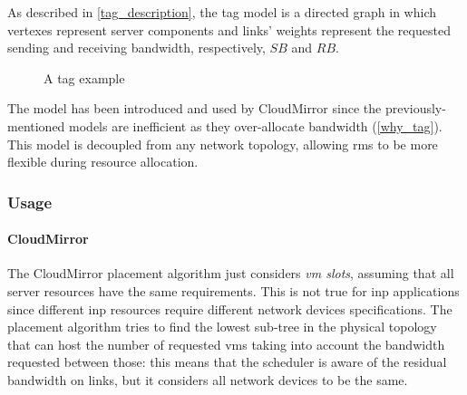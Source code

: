 
As described in \autoref{tag_description}, the \gls{tag} model is a directed graph in which vertexes represent server components and links' weights represent the requested sending and receiving bandwidth, respectively, $SB$ and $RB$.

\begin{figure}[!htb]
    \centering
    \usebox{\tagfigure}
    \caption{A \gls{tag} example}
\end{figure}

The model has been introduced and used by CloudMirror \cite{cloudmirror} since the previously\hyp{}mentioned models are inefficient as they over\hyp{}allocate bandwidth (\autoref{why_tag}).
This model is decoupled from any network topology, allowing \glspl{rm} to be more flexible during resource allocation.

\subsubsection{Usage}
\paragraph{CloudMirror \texorpdfstring{\cite{cloudmirror}}{}}
The CloudMirror \cite{cloudmirror} placement algorithm just considers \textit{\gls{vm} slots}, assuming that all server resources have the same requirements.
This is not true for \gls{inp} applications since different \gls{inp} resources require different network devices specifications.
The placement algorithm tries to find the lowest sub-tree in the physical topology that can host the number of requested \glspl{vm} taking into account the bandwidth requested between those: this means that the scheduler is aware of the residual bandwidth on links, but it considers all network devices to be the same.